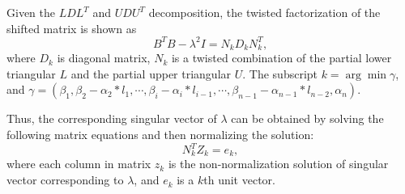 Given the $LDL^T$ and $UDU^T$ decomposition, the twisted factorization of the shifted matrix is shown as
\begin{equation}
B^T B - \lambda^2 I = N_k D_k N_k^T ,
\label{eq:twisted}
\end{equation}
where $D_k$ is diagonal matrix, $N_k$ is a twisted combination of the partial lower triangular $L$ and the partial upper triangular $U$.
The subscript $k = \arg \min \gamma$, and $\gamma = (\beta_1, \beta_2 - \alpha_2 * l_1, \cdots, \beta_i - \alpha_i * l_{i-1}, \cdots, \beta_{n-1} - \alpha_{n-1} * l_{n-2}, \alpha_n)$.

Thus, the corresponding singular vector of $\lambda$ can be obtained by solving the following matrix equations and then normalizing the solution:
\begin{equation}
\label{eq:unnorm}
N_k^T Z_k = e_k ,
\end{equation}
 where each column in matrix $z_k$ is the non-normalization solution of singular vector corresponding to $\lambda$, and $e_k$ is a $k$th unit vector.

